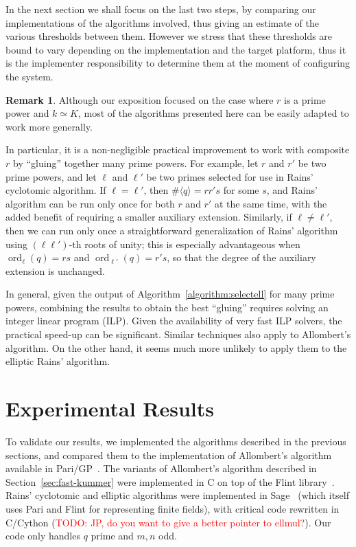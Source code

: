 \documentclass[12pt]{article}
\theoremstyle{plain}
\theoremstyle{definition}
\newtheorem*{remark}{Remark}
\newcommand{\todo}[1]{\textcolor{red}{TODO: #1}}
\DeclareMathOperator{\order}{ord} %
\newcounter{algorithm}
\begin{document}
In the next section we shall focus on the last two steps, by comparing
our implementations of the
algorithms involved, thus giving an estimate of the various thresholds
between them.  However we stress that these thresholds are bound to
vary depending on the implementation and the target platform, thus it
is the implementer responsibility to determine them at the moment of
configuring the system.

\begin{remark}
  Although our exposition focused on the case where $r$ is a prime
  power and $k\simeq K$, most of the algorithms presented here can be
  easily adapted to work more generally.

  In particular, it is a non-negligible practical improvement to work
  with composite $r$ by ``gluing'' together many prime powers. For
  example, let $r$ and $r'$ be two prime powers, and let $\ell$ and
  $\ell'$ be two primes selected for use in Rains' cyclotomic
  algorithm. If $\ell=\ell'$, then $\#\langle q\rangle=rr's$ for some
  $s$, and Rains' algorithm can be run only once for both $r$ and $r'$
  at the same time, with the added benefit of requiring a smaller
  auxiliary extension. Similarly, if $\ell\ne\ell'$, then we can run
  only once a straightforward generalization of Rains' algorithm using
  $(\ell\ell')$-th roots of unity; this is especially advantageous
  when $\order_\ell(q) = rs$ and $\order_{\ell'}(q) = r's$, so that
  the degree of the auxiliary extension is unchanged.

  In general, given the output of Algorithm~\ref{algorithm:selectell} for
  many prime powers, combining the results to obtain the best
  ``gluing'' requires solving an integer linear program (ILP). Given
  the availability of very fast ILP solvers, the practical speed-up
  can be significant.  Similar techniques also apply to Allombert's
  algorithm. On the other hand, it seems much more unlikely to apply
  them to the elliptic Rains' algorithm.
\end{remark}



\section{Experimental Results}
\label{sec:experimental-results}

To validate our results, we implemented the algorithms described in
the previous sections, and compared them to the implementation of
Allombert's algorithm available in Pari/GP~\cite{Pari}. The variants
of Allombert's algorithm described in Section~\ref{sec:fast-kummer}
were implemented in C on top of the Flint
library~\cite{hart2010flint}. Rains' cyclotomic and elliptic
algorithms were implemented in Sage~\cite{Sage} (which itself uses
Pari and Flint for representing finite fields), with critical code
rewritten in C/Cython (\todo{JP, do you want to give a better pointer
  to ellmul?}). Our code only handles $q$ prime and $m,n$ odd.
\end{document}
